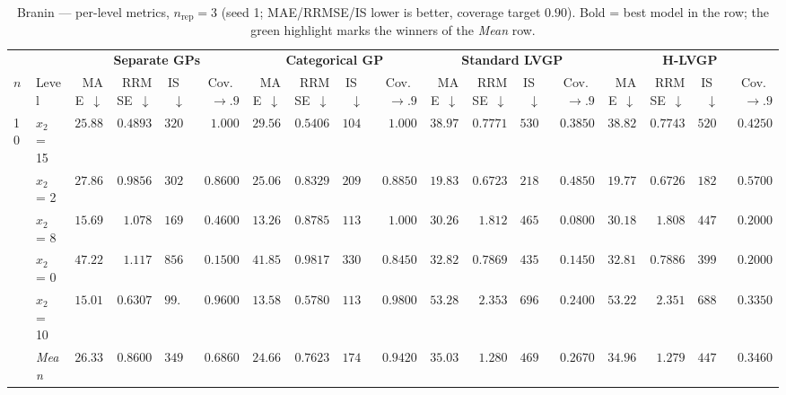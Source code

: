 \begin{table}[htbp]
\centering
\scriptsize
\setlength{\tabcolsep}{2.5pt}
\setlength{\fboxsep}{1pt}
\caption{Branin --- per-level metrics, $n_{\mathrm{rep}}=3$ (seed 1; MAE/RRMSE/IS lower is better, coverage target $0.90$). Bold = best model in the row; the green highlight marks the winners of the \emph{Mean} row.}
\label{tab:branin_hetero_nrep03}
\begin{tabular}{llrrrrrrrrrrrrrrrr}
\toprule
 & & \multicolumn{4}{c}{\textbf{Separate GPs}} & \multicolumn{4}{c}{\textbf{Categorical GP}} & \multicolumn{4}{c}{\textbf{Standard LVGP}} & \multicolumn{4}{c}{\textbf{H-LVGP}} \\
\cmidrule(lr){3-6} \cmidrule(lr){7-10} \cmidrule(lr){11-14} \cmidrule(lr){15-18}
$n$ & Level & MAE~$\downarrow$ & RRMSE~$\downarrow$ & IS~$\downarrow$ & Cov.~$\to.9$ & MAE~$\downarrow$ & RRMSE~$\downarrow$ & IS~$\downarrow$ & Cov.~$\to.9$ & MAE~$\downarrow$ & RRMSE~$\downarrow$ & IS~$\downarrow$ & Cov.~$\to.9$ & MAE~$\downarrow$ & RRMSE~$\downarrow$ & IS~$\downarrow$ & Cov.~$\to.9$ \\
\midrule
\multirow{6}{*}{10} & $x_2$ = 15 & {\boldmath$25.88$} & {\boldmath$0.4893$} & $320.7$ & {\boldmath$1.000$} & $29.56$ & $0.5406$ & {\boldmath$104.7$} & $1.000$ & $38.97$ & $0.7771$ & $530.2$ & $0.3850$ & $38.82$ & $0.7743$ & $520.3$ & $0.4250$ \\
 & $x_2$ = 2 & $27.86$ & $0.9856$ & $302.1$ & $0.8600$ & $25.06$ & $0.8329$ & $209.4$ & {\boldmath$0.8850$} & $19.83$ & {\boldmath$0.6723$} & $218.5$ & $0.4850$ & {\boldmath$19.77$} & $0.6726$ & {\boldmath$182.3$} & $0.5700$ \\
 & $x_2$ = 8 & $15.69$ & $1.078$ & $169.5$ & $0.4600$ & {\boldmath$13.26$} & {\boldmath$0.8785$} & {\boldmath$113.3$} & {\boldmath$1.000$} & $30.26$ & $1.812$ & $465.1$ & $0.0800$ & $30.18$ & $1.808$ & $447.6$ & $0.2000$ \\
 & $x_2$ = 0 & $47.22$ & $1.117$ & $856.5$ & $0.1500$ & $41.85$ & $0.9817$ & {\boldmath$330.5$} & {\boldmath$0.8450$} & $32.82$ & {\boldmath$0.7869$} & $435.2$ & $0.1450$ & {\boldmath$32.81$} & $0.7886$ & $399.3$ & $0.2000$ \\
 & $x_2$ = 10 & $15.01$ & $0.6307$ & {\boldmath$99.37$} & {\boldmath$0.9600$} & {\boldmath$13.58$} & {\boldmath$0.5780$} & $113.9$ & $0.9800$ & $53.28$ & $2.353$ & $696.4$ & $0.2400$ & $53.22$ & $2.351$ & $688.1$ & $0.3350$ \\
 & \textit{Mean} & $26.33$ & $0.8600$ & $349.7$ & $0.6860$ & \colorbox{green!20}{\boldmath$24.66$} & \colorbox{green!20}{\boldmath$0.7623$} & \colorbox{green!20}{\boldmath$174.4$} & \colorbox{green!20}{\boldmath$0.9420$} & $35.03$ & $1.280$ & $469.1$ & $0.2670$ & $34.96$ & $1.279$ & $447.5$ & $0.3460$ \\

\end{tabular}
\end{table}
